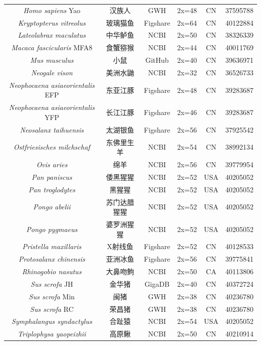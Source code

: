 {{\begin{longtable}{cccccc}
    \textit{Homo sapiens} Yao & 汉族人 & GWH & 2x=48 & CN & 37595788 \\
    \textit{Kryptopterus vitreolus} & 玻璃猫鱼 & Figshare & 2x=64 & CN & 40122884 \\
    \textit{Lateolabrax maculatus} & 中华鲈鱼 & NCBI & 2x=50 & CN & 38326339 \\
    \textit{Macaca fascicularis} MFA8 & 食蟹猕猴 & NCBI & 2x=44 & CN & 40011769 \\
    \textit{Mus musculus} & 小鼠 & GitHub & 2x=40 & CN & 39636971 \\
    \textit{Neogale vison} & 美洲水鼬 & NCBI & 2x=32 & CN & 36526733 \\
    \textit{Neophocaena asiaeorientalis} EFP & 东亚江豚 & Figshare & 2x=48 & CN & 39283687 \\
    \textit{Neophocaena asiaeorientalis} YFP & 长江江豚 & Figshare & 2x=46 & CN & 39283687 \\
    \textit{Neosalanx taihuensis} & 太湖银鱼 & Figshare & 2x=56 & CN & 37925542 \\
    \textit{Ostfriesisches milchschaf} & 东佛里生羊 & NCBI & 2x=54 & CN & 38992134 \\
    \textit{Ovis aries} & 绵羊 & NCBI & 2x=56 & CN & 39779954 \\
    \textit{Pan paniscus} & 倭黑猩猩 & NCBI & 2x=52 & USA & 40205052 \\
    \textit{Pan troglodytes} & 黑猩猩 & NCBI & 2x=52 & USA & 40205052 \\
    \textit{Pongo abelii} & 苏门达腊猩猩 & NCBI & 2x=52 & USA & 40205052 \\
    \textit{Pongo pygmaeus} & 婆罗洲猩猩 & NCBI & 2x=52 & USA & 40205052 \\
    \textit{Pristella maxillaris} & X射线鱼 & Figshare & 2x=52 & CN & 40128533 \\
    \textit{Protosalanx chinensis} & 亚洲冰鱼 & Figshare & 2x=56 & CN & 39775841 \\
    \textit{Rhinogobio nasutus} & 大鼻吻鮈 & NCBI & 2x=50 & CA & 40113806 \\
    \textit{Sus scrofa} JH & 金华猪 & GigaDB & 2x=40 & CN & 40372724 \\
    \textit{Sus scrofa} Min & 闽猪 & GWH & 2x=38 & CN & 40236780 \\
    \textit{Sus scrofa} RC & 荣昌猪 & GWH & 2x=38 & CN & 40236780 \\
    \textit{Symphalangus syndactylus} & 合趾猿 & NCBI & 2x=54 & USA & 40205052 \\
    \textit{Triplophysa yaopeizhii} & 高原鳅 & NCBI & 2x=50 & CN & 40210914 \\
    \bottomrule
\end{longtable}
}

}
